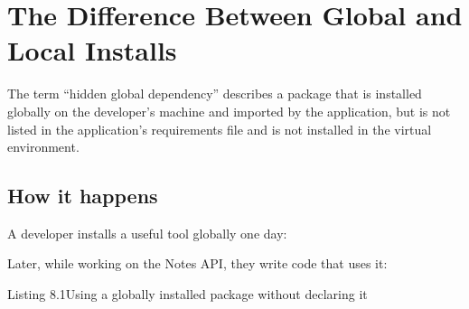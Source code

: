 \setcounter{section}{0}
\section{The Difference Between Global and Local Installs}\label{08-hidden-dependencies:81-the-difference-between-global-and-local-installs}

The term ``hidden global dependency'' describes a package that is installed globally on the developer's machine and imported by the application, but is not listed in the application's requirements file and is not installed in the virtual environment.

\subsection*{How it happens}\label{08-hidden-dependencies:how-it-happens}

A developer installs a useful tool globally one day:

\begin{codebox}[short]

\begin{Shaded}
\begin{Highlighting}[]
\end{Highlighting}
\end{Shaded}

\end{codebox}

\noindent{}Later, while working on the Notes API, they write code that uses it:

\begin{codeboxcap}[short]{\textcolor{accent}{Listing 8.1}\enspace Using a globally installed package without declaring it}

\begin{Shaded}
\begin{Highlighting}[]

\NormalTok{):}
\OperatorTok{=}\NormalTok{\{}
\NormalTok{    \})}
\end{Highlighting}
\end{Shaded}

\end{codeboxcap}

